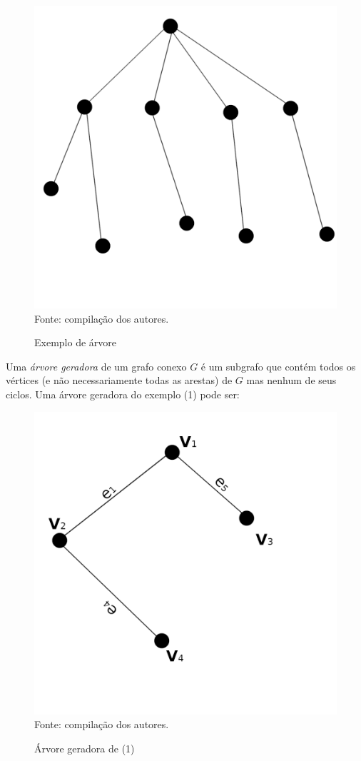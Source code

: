 \documentclass[twocolumn, 10pt]{extarticle}
\begin{document}
\begin{figure}[H]
	\caption{Exemplo de árvore} 
	\centering
	\includegraphics[scale=0.7]{tree1}
	\\ Fonte: compilação dos autores.
\end{figure}

Uma \textit{árvore geradora} de um grafo conexo $G$ é um subgrafo que contém todos os vértices (e não necessariamente todas as arestas) de $G$ mas nenhum de seus ciclos. Uma árvore geradora do exemplo (1) pode ser:

\begin{figure}[H]
	\caption{Árvore geradora de (1)} 
	\centering
	\includegraphics[scale=0.7]{spanning1}
	\\ Fonte: compilação dos autores.
\end{figure}
\end{document}
